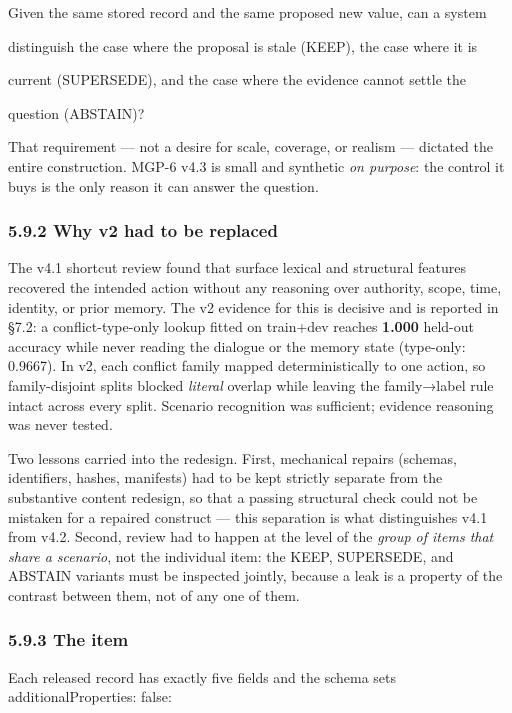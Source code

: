 Given the same stored record and the same proposed new value, can a
system

distinguish the case where the proposal is stale (KEEP), the case where
it is

current (SUPERSEDE), and the case where the evidence cannot settle the

question (ABSTAIN)?

That requirement --- not a desire for scale, coverage, or realism ---
dictated the entire construction. MGP-6 v4.3 is small and synthetic
\emph{on purpose}: the control it buys is the only reason it can answer
the question.

\subsubsection{5.9.2 Why v2 had to be
replaced}\label{why-v2-had-to-be-replaced}

The v4.1 shortcut review found that surface lexical and structural
features recovered the intended action without any reasoning over
authority, scope, time, identity, or prior memory. The v2 evidence for
this is decisive and is reported in §7.2: a conflict-type-only lookup
fitted on train+dev reaches \textbf{1.000} held-out accuracy while never
reading the dialogue or the memory state (type-only: 0.9667). In v2,
each conflict family mapped deterministically to one action, so
family-disjoint splits blocked \emph{literal} overlap while leaving the
family→label rule intact across every split. Scenario recognition was
sufficient; evidence reasoning was never tested.

Two lessons carried into the redesign. First, mechanical repairs
(schemas, identifiers, hashes, manifests) had to be kept strictly
separate from the substantive content redesign, so that a passing
structural check could not be mistaken for a repaired construct --- this
separation is what distinguishes v4.1 from v4.2. Second, review had to
happen at the level of the \emph{group of items that share a scenario},
not the individual item: the KEEP, SUPERSEDE, and ABSTAIN variants must
be inspected jointly, because a leak is a property of the contrast
between them, not of any one of them.

\subsubsection{5.9.3 The item}\label{the-item}

Each released record has exactly five fields and the schema sets
additionalProperties: false:

